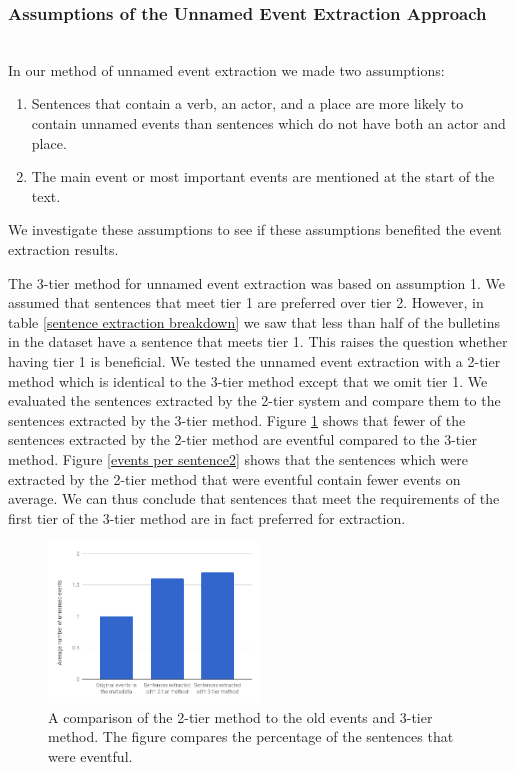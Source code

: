 \documentclass[a4paper, 10pt, conference]{ieeeconf}      %
\begin{document}
\subsubsection{Assumptions of the Unnamed Event Extraction Approach}\label{impr extraction}~\\
In our method of unnamed event extraction we made two assumptions:
\begin{enumerate}
\item Sentences that contain a verb, an actor, and a place are more likely to contain unnamed events than sentences which do not have both an actor and place.
\item The main event or most important events are mentioned at the start of the text.
\end{enumerate}
We investigate these assumptions to see if these assumptions benefited the event extraction results. 

The 3-tier method for unnamed event extraction was based on assumption 1. We assumed that sentences that meet tier 1 are preferred over tier 2. However, in table \ref{sentence extraction breakdown} we saw that less than half of the bulletins in the dataset have a sentence that meets tier 1. This raises the question whether having tier 1 is beneficial. We tested the unnamed event extraction with a 2-tier method which is identical to the 3-tier method except that we omit tier 1. We evaluated the sentences extracted by the 2-tier system and compare them to the sentences extracted by the 3-tier method. Figure \ref{percentage eventful2} shows that fewer of the sentences extracted by the 2-tier method are eventful compared to the 3-tier method. Figure \ref{events per sentence2} shows that the sentences which were extracted by the 2-tier method that were eventful contain fewer events on average. We can thus conclude that sentences that meet the requirements of the first tier of the 3-tier method are in fact preferred for extraction. 

\begin{figure}
  \centering
  \includegraphics[width= 0.5\textwidth]{sentencesWithEvent}
  \caption{A comparison of the 2-tier method to the old events and 3-tier method. The figure compares the percentage of the sentences that were eventful.}
  \label{percentage eventful2}
\end{figure}
\end{document}
